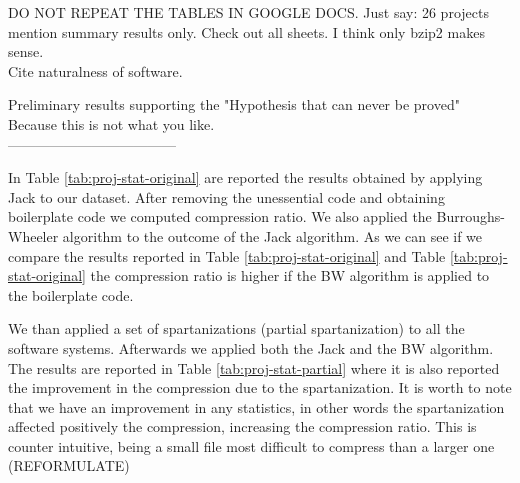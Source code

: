 
DO NOT REPEAT THE TABLES IN GOOGLE DOCS.
Just say: 26 projects mention summary results only.
Check out all sheets. I think only bzip2 makes sense.\\

Cite naturalness of software.

Preliminary results supporting the 
"Hypothesis that can never be proved"
Because this is not what you like.\\

------------------------------------

In Table \ref{tab:proj-stat-original} are reported the results obtained by applying Jack to our dataset. 
After removing the unessential code and obtaining boilerplate code we computed compression ratio. 
We also applied the Burroughs-Wheeler algorithm to the outcome of the Jack algorithm.
As we can see if we compare the results reported in Table \ref{tab:proj-stat-original}
and Table \ref{tab:proj-stat-original} the compression ratio is higher if the BW algorithm
is applied to the boilerplate code.

\begin{table*}
\centering
{}
\label{tab:proj-stat-original}
\caption{The results of the compression using the Jack algorithm alone and both Jack and 
Burroughs-Wheeler algorithms combined.}
\end{table*}

We than applied a set of spartanizations (partial spartanization) to all the software systems.
Afterwards we applied both the Jack and the BW algorithm. The results are reported in Table \ref{tab:proj-stat-partial} where
it is also reported the improvement in the compression due to the spartanization. 
It is worth to note that we have an improvement in any statistics, in other words the spartanization affected positively
the compression, increasing the compression ratio. 
This is counter intuitive, being a small file most difficult to compress than a larger one (REFORMULATE)

